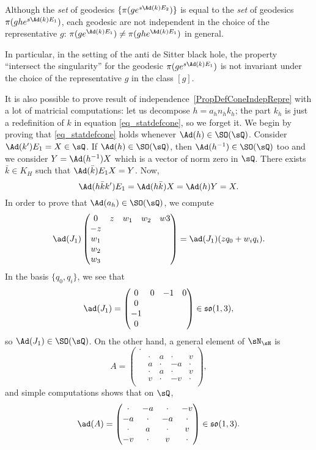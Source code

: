 \begin{remark}		\label{RemGedNonInvarChoix}
Although the \emph{set} of geodesics $\{ \pi(g e^{s\Ad(k)E_2}) \}$ is equal to the \emph{set} of geodesics $\pi(gh e^{s\Ad(k)E_1})$, each geodesic are not independent in the choice of the representative $g$: $\pi(g e^{\Ad(k)E_1})\neq\pi(gh e^{\Ad(k)E_1})$ in general.

In particular, in the setting of the anti de Sitter black hole, the property ``intersect the singularity'' for the geodesic $\pi(g e^{s\Ad(k)E_1})$ is not invariant under the choice of the representative $g$ in the class $[g]$.
\end{remark}

It is also possible to prove result of independence~\ref{PropDefConeIndepRepre} with a lot of matricial computations: let us decompose $h=a_hn_hk_h$; the part $k_h$ is just a redefinition of $k$ in equation \eqref{eq_statdefcone}, so we forget it. We begin by proving that \eqref{eq_statdefcone} holds whenever $\Ad(h)\in \SO(\sQ)$. Consider $\Ad(k')E_1=X\in\sQ$. If $\Ad(h)\in \SO(\sQ)$, then $\Ad(h^{-1})\in \SO(\sQ)$ too and we consider $Y=\Ad(h^{-1})X$ which is a vector of norm zero in $\sQ$. There exists $\bar k\in K_H$ such that $\Ad(\bar k)E_1X=Y$. Now,
\begin{equation}
\Ad(h\bar kk')E_1=\Ad(h\bar k)X
		=\Ad(h)Y
		=X.
\end{equation}
In order to prove that $\Ad(a_h)\in \SO(\sQ)$, we compute
\[
  \ad(J_1)\begin{pmatrix}
0	& z	& w_1	& w_2	& w3\\
-z\\
w_1\\
w_2\\
w_3
\end{pmatrix}
=\ad(J_1)(zq_0+w_iq_i).
\]
In the basis $\{ q_0,q_i \}$, we see that
\[
  \ad(J_1)=\begin{pmatrix}
0&0&-1&0\\
0\\-1\\0
\end{pmatrix}\in\mathfrak{so}(1,3),
\]
so $\Ad(J_1)\in \SO(\sQ)$. On the other hand, a general element of $\sN_{\sH}$ is
\[
  A=\begin{pmatrix}
\cdot\\
&\cdot& a&\cdot& v\\
&a&\cdot &-a&\cdot\\
&  \cdot& a&\cdot& v\\
&v&\cdot&-v&\cdot\\
\end{pmatrix},
\]
and simple computations shows that on $\sQ$,
\[
  \ad(A)=\begin{pmatrix}
\cdot &-a&\cdot&-v\\
-a&\cdot&-a&\cdot\\
\cdot&a&\cdot &v\\
-v&\cdot&v&\cdot
\end{pmatrix}\in\mathfrak{so}(1,3).
\]

